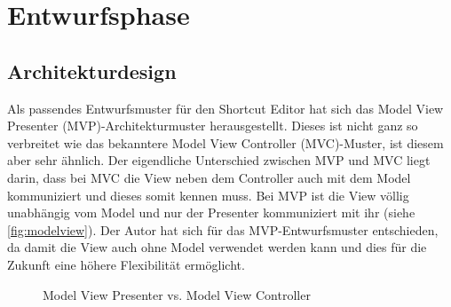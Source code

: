 \section{Entwurfsphase}

\subsection{Architekturdesign}
\label{Architekturdesign}

Als passendes Entwurfsmuster für den Shortcut Editor hat sich das Model View Presenter (MVP)-Architekturmuster herausgestellt. Dieses ist nicht ganz so verbreitet wie das bekanntere Model View Controller (MVC)-Muster, ist diesem aber sehr ähnlich. Der eigendliche Unterschied zwischen MVP und MVC liegt darin, dass bei MVC die View neben dem Controller auch mit dem Model kommuniziert und dieses somit kennen muss. Bei MVP ist die View völlig unabhängig vom Model und nur der Presenter kommuniziert mit ihr (siehe \autoref{fig:modelview}). Der Autor hat sich für das MVP-Entwurfsmuster entschieden, da damit die View auch ohne Model verwendet werden kann und dies für die Zukunft eine höhere Flexibilität ermöglicht.

\begin{figure}[H] 
	\hfill 
	\caption{Model View Presenter vs. Model View Controller} 
	\label{fig:modelview}
\end{figure}

